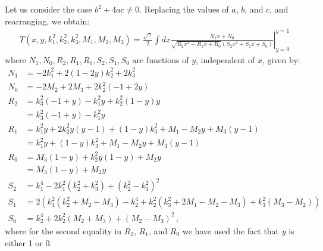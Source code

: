 \documentclass[twoside]{article}
\begin{document}
Let us consider the case $b^2 + 4 a c \neq 0$.
Replacing the values of $a$, $b$, and $c$, and rearranging, we obtain:
\begin{align}
\label{eq:param}
  T(x, y, k^2_1, k^2_2, k^2_3, M_1, M_2, M_3) = \frac{\sqrt{\pi}}{2}\int dx \left.\frac{N_1 x + N_0}{\sqrt{R_2 x^2 + R_1 x + R_0}\left(S_2 x^2 + S_1 x + S_0\right)}\right|^{y = 1}_{y = 0}
\end{align}
where $N_1, N_0, R_2, R_1, R_0, S_2, S_1, S_0$ are functions of $y$, independent of $x$, given by:
\begin{align*}
N_1 &= - 2 k_1^2+ 2 (1-2y) k_2^2 + 2 k_3^2\\
N_0 &= -2 M_2 + 2 M_3 + 2 k_2^2 (-1+2y) \\
R_2 &= k_3^2 (-1 + y) - k_1^2 y + k_2^2 (1 - y) y\\
& = k_3^2 (-1 + y) - k_1^2 y \\
R_1 &= k_1^2 y+ 2 k_2^2 y\left(y-1\right)+(1-y) k_3^2 + M_1 - M_2 y+M_3 (y-1) \\
&= k_1^2 y +(1-y) k_3^2 + M_1 - M_2 y+M_3 (y-1)\\
R_0 &= M_3 (1-y) + k_2^2 y (1-y) + M_2 y \\
&= M_3 (1-y) + M_2 y \\
S_2 &= k_1^4-2 k_1^2 (k_2^2+k_3^2)+(k_2^2-k_3^2)^2 \\
S_1 &= 2 \left(k_1^2 (k_2^2+M_2-M_3)-k_2^4+k_2^2 (k_3^2+2 M_1-M_2-M_3)+k_3^2 (M_3-M_2)\right) \\
S_0 &= k_2^4+2 k_2^2 (M_2+M_3)+(M_2-M_3)^2\,,
\end{align*}
where for the second equality in $R_2$, $R_1$, and $R_0$ we have used the fact that $y$ is either 1 or 0.
\end{document}
